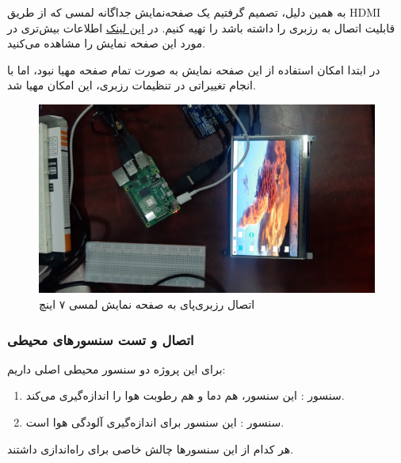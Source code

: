\documentclass[12pt]{article}
\begin{document}
به همین دلیل، تصمیم گرفتیم یک صفحه‌نمایش جداگانه لمسی که از طریق HDMI قابلیت اتصال به رزبری را داشته باشد را تهیه کنیم.
 در  
 \href{https://www.waveshare.com/wiki/7inch_HDMI_LCD_(B)}{این لینک}
 اطلاعات بیش‌تری در مورد این صفحه نمایش را مشاهده می‌کنید.
 
در ابتدا امکان استفاده از این صفحه نمایش به صورت تمام صفحه مهیا نبود، اما با انجام تغییراتی در تنظیمات رزبری، این امکان مهیا شد.

\begin{figure}[H]
	\begin{center}
		\includegraphics[width=.70\textwidth]{images/lcd.jpg}
	\end{center}
	\caption{اتصال رزبری‌پای به صفحه نمایش لمسی ۷ اینچ}
\end{figure}





\subsubsection{اتصال و تست سنسورهای محیطی} \label{environ}

برای این پروژه دو سنسور محیطی اصلی داریم:

\begin{enumerate}
	\item
 سنسور : این سنسور،‌ هم دما و هم رطوبت هوا را اندازه‌گیری می‌کند.


	\item 
سنسور : این سنسور برای اندازه‌گیری آلودگی هوا است.

\end{enumerate}

هر کدام از این سنسورها چالش خاصی برای راه‌اندازی داشتند.
\end{document}
